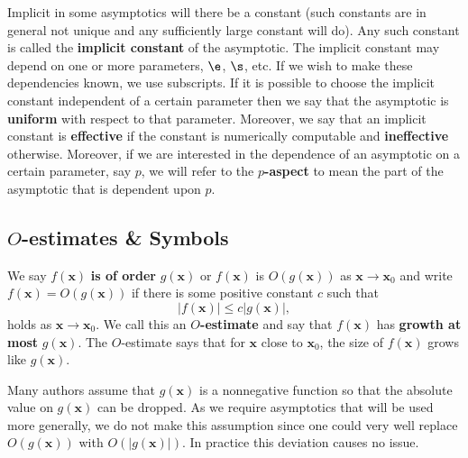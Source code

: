     Implicit in some asymptotics will there be a constant (such constants are in general not unique and any sufficiently large constant will do). Any such constant is called the \textbf{implicit constant} of the asymptotic. The implicit constant may depend on one or more parameters, $\e$, $\s$, etc. If we wish to make these dependencies known, we use subscripts. If it is possible to choose the implicit constant independent of a certain parameter then we say that the asymptotic is \textbf{uniform} with respect to that parameter. Moreover, we say that an implicit constant is \textbf{effective} if the constant is numerically computable and \textbf{ineffective} otherwise. Moreover, if we are interested in the dependence of an asymptotic on a certain parameter, say $p$, we will refer to the \textbf{$p$-aspect} to mean the part of the asymptotic that is dependent upon $p$.
    \subsection*{\texorpdfstring{$O$}{O}-estimates \& Symbols}
      We say $f(\mathbf{x})$ \textbf{is of order} $g(\mathbf{x})$ or $f(\mathbf{x})$ is $O(g(\mathbf{x}))$ as $\mathbf{x} \to \mathbf{x}_{0}$ and write $f(\mathbf{x}) = O(g(\mathbf{x}))$
      if there is some positive constant $c$ such that
      \[
        |f(\mathbf{x})| \le c|g(\mathbf{x})|,
      \]
      holds as $\mathbf{x} \to \mathbf{x}_{0}$. We call this an \textbf{$O$-estimate} and say that $f(\mathbf{x})$ has \textbf{growth at most} $g(\mathbf{x})$. The $O$-estimate says that for $\mathbf{x}$ close to $\mathbf{x}_{0}$, the size of $f(\mathbf{x})$ grows like $g(\mathbf{x})$.
      
      \begin{remark}
        Many authors assume that $g(\mathbf{x})$ is a nonnegative function so that the absolute value on $g(\mathbf{x})$ can be dropped. As we require asymptotics that will be used more generally, we do not make this assumption since one could very well replace $O(g(\mathbf{x}))$ with $O(|g(\mathbf{x})|)$. In practice this deviation causes no issue.
      \end{remark}
      
